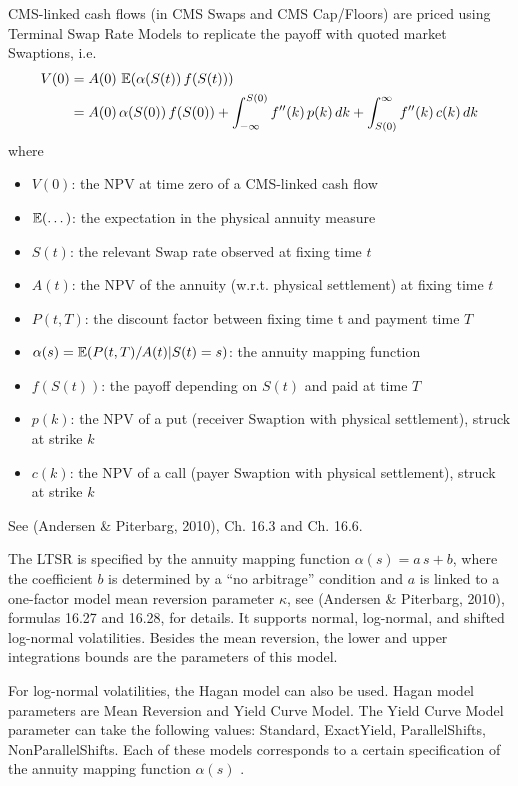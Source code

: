 CMS-linked cash flows (in CMS Swaps and CMS Cap/Floors) are priced using Terminal 
Swap Rate Models to replicate the payoff with quoted market Swaptions, i.e.
\begin{align*}
V(0) &= A(0)\,\operatorname{\mathbb{E}}(\alpha(S(t))\,f(S(t))) \\
&= A(0)\,\alpha(S(0))\,f(S(0)) +\int_{-\infty}^{S(0)} f'' (k)\,p(k)\,dk 
+ \int_{S(0)}^\infty f''(k)\,c(k)\,dk
\end{align*}
where
\begin{itemize}
\item $V(0)$: the NPV at time zero of a CMS-linked cash flow
\item $\operatorname{\mathbb{E}}(\dots)$: the expectation in the physical annuity measure
\item $S(t)$: the relevant Swap rate observed at fixing time $t$
\item $A(t)$: the NPV of the annuity (w.r.t. physical settlement) at fixing 
time $t$
\item $P(t,T)$: the discount factor between fixing time t and payment time $T$
\item $\alpha(s)=\operatorname{\mathbb{E}}(P(t,T)/A(t) | S(t) = s)$: the annuity mapping function
\item $f(S(t))$: the payoff depending on $S(t)$ and paid at time $T$
\item $p(k)$: the NPV of a put (receiver Swaption with physical settlement), 
struck at strike $k$
\item $c(k)$: the NPV of a call (payer Swaption with physical settlement), 
struck at strike $k$
\end{itemize}
See (Andersen \& Piterbarg, 2010), Ch. 16.3 and Ch. 16.6. 

The LTSR is specified by the annuity mapping function $\alpha(s)=a\,s+b$, 
where the coefficient $b$ is determined by a ``no arbitrage'' condition and $a$ 
is linked to a one-factor model mean reversion parameter $\kappa$, see 
(Andersen \& Piterbarg, 2010), formulas 16.27 and 16.28, for details. It 
supports normal, log-normal, and shifted log-normal volatilities. Besides the 
mean reversion, the lower and upper integrations bounds are the parameters of 
this model.

For log-normal volatilities, the Hagan model can also be used. Hagan model 
parameters are Mean Reversion and Yield Curve Model. The Yield Curve Model 
parameter can take the following values: Standard, ExactYield, ParallelShifts, 
NonParallelShifts. Each of these models corresponds to a certain specification 
of the annuity mapping function $\alpha(s)$ \cite{Hagan_2003}.

